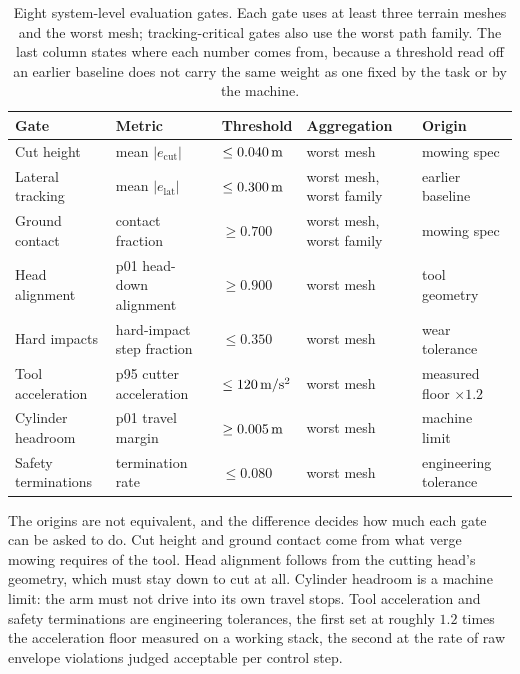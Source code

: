 \begin{table}[htbp]
  \centering
  \caption{Eight system-level evaluation gates. Each gate uses at least three
  terrain meshes and the worst mesh; tracking-critical gates also use the worst
  path family. The last column states where each number comes from, because a
  threshold read off an earlier baseline does not carry the same weight as one
  fixed by the task or by the machine.}
  \label{tab:sys:gates}
  \footnotesize
  \setlength{\tabcolsep}{3pt}
  \renewcommand{\arraystretch}{1.08}
  \begin{tabular}{@{}
    >{\raggedright\arraybackslash}p{}
    >{\raggedright\arraybackslash}p{}
    >{\raggedright\arraybackslash}p{}
    >{\raggedright\arraybackslash}p{}
    >{\raggedright\arraybackslash}p{}@{}}
    \toprule
    Gate & Metric & Threshold & Aggregation & Origin \\
    \midrule
    Cut height        & mean $|e_{\mathrm{cut}}|$
                      & $\leq \unit[0.040]{m}$ & worst mesh & mowing spec \\
    Lateral tracking  & mean $|e_{\mathrm{lat}}|$
                      & $\leq \unit[0.300]{m}$ & worst mesh, worst family & earlier baseline \\
    Ground contact    & contact fraction
                      & $\geq 0.700$ & worst mesh, worst family & mowing spec \\
    Head alignment    & p01 head-down alignment
                      & $\geq 0.900$ & worst mesh & tool geometry \\
    Hard impacts      & hard-impact step fraction
                      & $\leq 0.350$ & worst mesh & wear tolerance \\
    Tool acceleration & p95 cutter acceleration
                      & $\leq \unit[120]{m/s^2}$ & worst mesh & measured floor $\times 1.2$ \\
    Cylinder headroom & p01 travel margin
                      & $\geq \unit[0.005]{m}$ & worst mesh & machine limit \\
    Safety terminations & termination rate
                      & $\leq 0.080$ & worst mesh & engineering tolerance \\
    \bottomrule
  \end{tabular}
\end{table}

The origins are not equivalent, and the difference decides how much each gate
can be asked to do. Cut height and ground contact come from what verge mowing
requires of the tool. Head alignment follows from the cutting head's geometry,
which must stay down to cut at all. Cylinder headroom is a machine limit: the
arm must not drive into its own travel stops. Tool acceleration and safety
terminations are engineering tolerances, the first set at roughly $1.2$ times
the acceleration floor measured on a working stack, the second at the rate of
raw envelope violations judged acceptable per control step.

